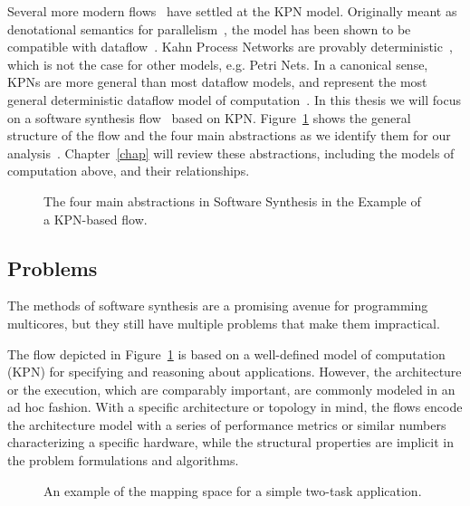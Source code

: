 Several more modern flows~\cite{thiele2007DOL,maps,pimentel2006systematic,kangas2006uml} have settled at the \ac{KPN} model.
Originally meant as denotational semantics for parallelism~\cite{kahn74}, the model has been shown to be compatible with dataflow~\cite{lee1995dataflow}.
Kahn Process Networks are provably deterministic~\cite{kahn74}, which is not the case for other models, e.g. Petri Nets.
In a canonical sense, \acp{KPN} are more general than most dataflow models, and represent the most general deterministic dataflow model of computation~\cite{lee_matsikoudis_semantics}.
In this thesis we will focus on a software synthesis flow~\cite{maps,castrillon2014thesis} based on \ac{KPN}.
Figure~\ref{fig:software_synthesis_flows} shows the general structure of the flow and the four main abstractions as we identify them for our analysis~\cite{goens_mcsoc16}.
Chapter~\ref{chap} will review these abstractions, including the models of computation above, and their relationships.

\begin{figure}[h]
	\centering
   \resizebox{0.75\textwidth}{!}{}
   \caption{The four main abstractions in Software Synthesis in the Example of a \acs{KPN}-based flow.} 
	\label{fig:software_synthesis_flows}
\end{figure}

\subsection{Problems}

The methods of software synthesis are a promising avenue for programming multicores, but they still have multiple problems that make them impractical.


The flow depicted in Figure~\ref{fig:software_synthesis_flows} is based on a well-defined model of computation (\ac{KPN}) for specifying and reasoning about applications.
However, the architecture or the execution, which are comparably important, are commonly modeled in an ad hoc fashion.
With a specific architecture or topology in mind, the flows encode the architecture model with a series of performance metrics or similar numbers characterizing a specific hardware, while the structural properties are implicit in the problem formulations and algorithms.

\begin{figure}[h]
	\centering
\resizebox{0.95\textwidth}{!}{
   \begin{tikzpicture}
     
   \end{tikzpicture}
 }
   \caption{An example of the mapping space for a simple two-task application.}
   \label{fig:mapping_space_motivation}
\end{figure}


